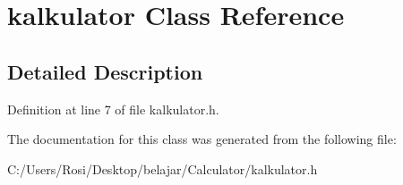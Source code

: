 \section{kalkulator Class Reference}
\label{classkalkulator}


\subsection{Detailed Description}




Definition at line 7 of file kalkulator.h.

The documentation for this class was generated from the following file:\begin{CompactItemize}
\item 
C:/Users/Rosi/Desktop/belajar/Calculator/kalkulator.h\end{CompactItemize}
